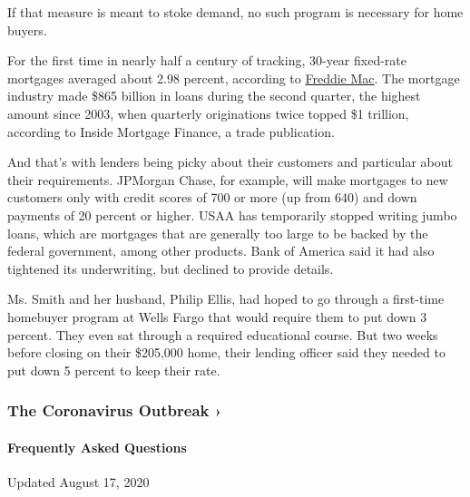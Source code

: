 If that measure is meant to stoke demand, no such program is necessary
for home buyers.

For the first time in nearly half a century of tracking, 30-year
fixed-rate mortgages averaged about 2.98 percent, according to
\href{https://freddiemac.gcs-web.com/news-releases/news-release-details/mortgage-rates-fall-below-three-percent}{Freddie
Mac}. The mortgage industry made \$865 billion in loans during the
second quarter, the highest amount since 2003, when quarterly
originations twice topped \$1 trillion, according to Inside Mortgage
Finance, a trade publication.

And that's with lenders being picky about their customers and particular
about their requirements. JPMorgan Chase, for example, will make
mortgages to new customers only with credit scores of 700 or more (up
from 640) and down payments of 20 percent or higher. USAA has
temporarily stopped writing jumbo loans, which are mortgages that are
generally too large to be backed by the federal government, among other
products. Bank of America said it had also tightened its underwriting,
but declined to provide details.

Ms. Smith and her husband, Philip Ellis, had hoped to go through a
first-time homebuyer program at Wells Fargo that would require them to
put down 3 percent. They even sat through a required educational course.
But two weeks before closing on their \$205,000 home, their lending
officer said they needed to put down 5 percent to keep their rate.

\href{https://www.nytimes3xbfgragh.onion/news-event/coronavirus?action=click\&pgtype=Article\&state=default\&region=MAIN_CONTENT_3\&context=storylines_faq}{}

\hypertarget{the-coronavirus-outbreak-}{%
\subsubsection{The Coronavirus Outbreak
›}\label{the-coronavirus-outbreak-}}

\hypertarget{frequently-asked-questions}{%
\paragraph{Frequently Asked
Questions}\label{frequently-asked-questions}}

Updated August 17, 2020

